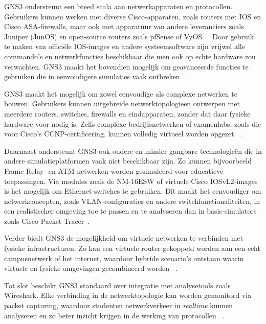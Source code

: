 \vspace{0.3cm}

GNS3 ondersteunt een breed scala aan netwerkapparaten en protocollen. Gebruikers kunnen werken met diverse Cisco-apparaten, zoals routers met IOS en Cisco ASA-firewalls, maar ook met apparatuur van andere leveranciers zoals Juniper (JunOS) en open-source routers zoals pfSense of VyOS ~\autocite{Amrizal2022}. Door gebruik te maken van officiële IOS-images en andere systeemsoftware zijn vrijwel alle commando’s en netwerkfuncties beschikbaar die men ook op echte hardware zou verwachten. GNS3 maakt het bovendien mogelijk om geavanceerde functies te gebruiken die in eenvoudigere simulaties vaak ontbreken ~\autocite{gns3_docs2025}.

\vspace{0.3cm}

GNS3 maakt het mogelijk om zowel eenvoudige als complexe netwerken te bouwen. Gebruikers kunnen uitgebreide netwerktopologieën ontwerpen met meerdere routers, switches, firewalls en eindapparaten, zonder dat daar fysieke hardware voor nodig is. Zelfs complexe bedrijfsnetwerken of examenlabs, zoals die voor Cisco’s CCNP-certificering, kunnen volledig virtueel worden opgezet ~\autocite{Gil2015}.

\vspace{0.3cm}

Daarnaast ondersteunt GNS3 ook oudere en minder gangbare technologieën die in andere simulatieplatformen vaak niet beschikbaar zijn. Zo kunnen bijvoorbeeld Frame Relay- en ATM-netwerken worden gesimuleerd voor educatieve toepassingen. Via modules zoals de NM-16ESW of virtuele Cisco IOSvL2-images is het mogelijk om Ethernet-switches te gebruiken. Dit maakt het eenvoudiger om netwerkconcepten, zoals VLAN-configuraties en andere switchfunctionaliteiten, in een realistischer omgeving toe te passen en te analyseren dan in basis-simulators zoals Cisco Packet Tracer~\autocite{gns3_doc2025}.

\vspace{0.3cm}

Verder biedt GNS3 de mogelijkheid om virtuele netwerken te verbinden met fysieke infrastructuren. Zo kan een virtuele router gekoppeld worden aan een echt campusnetwerk of het internet, waardoor hybride scenario’s ontstaan waarin virtuele en fysieke omgevingen gecombineerd worden ~\autocite{gns3_doc2025}.

\vspace{0.3cm}

Tot slot beschikt GNS3 standaard over integratie met analysetools zoals Wireshark. Elke verbinding in de netwerktopologie kan worden gemonitord via packet capturing, waardoor studenten netwerkverkeer in \textit{realtime} kunnen analyseren en zo beter inzicht krijgen in de werking van protocollen ~\autocite{Golightly2023}.



